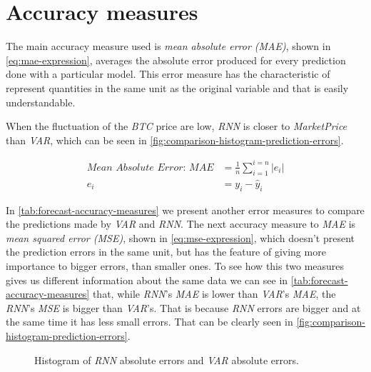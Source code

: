 \section{Accuracy measures}
\label{sec:accuracy-measures}

The main accuracy measure used is \textit{mean absolute error (MAE)},
shown in \autoref{eq:mae-expression}, averages the absolute error
produced for every prediction done with a particular model. This error
measure has the characteristic of represent quantities in the same
unit as the original variable and that is easily understandable.

When the fluctuation of the \textit{BTC} price are low, \textit{RNN}
is closer to \textit{MarketPrice} than \textit{VAR}, which can be seen
in \autoref{fig:comparison-histogram-prediction-errors}.

\begin{equation}
  \begin{aligned}
    \label{eq:mae-expression}
    \textit{Mean Absolute Error: MAE} & =
    \frac{1}{n} \sum_{i=1}^{i=n} |e_i|\\
    e_i & = y_i - \hat{y}_i
  \end{aligned}
\end{equation}

In \autoref{tab:forecast-accuracy-measures} we present another error
measures to compare the predictions made by \textit{VAR} and
\textit{RNN}. The next accuracy measure to \textit{MAE} is
\textit{mean squared error (MSE)}, shown in
\autoref{eq:mse-expression}, which doesn't present the prediction
errors in the same unit, but has the feature of giving more importance
to bigger errors, than smaller ones. To see how this two measures
gives us different information about the same data we can see in
\autoref{tab:forecast-accuracy-measures} that, while \textit{RNN}'s
\textit{MAE} is lower than \textit{VAR}'s \textit{MAE}, the
\textit{RNN}'s \textit{MSE} is bigger than \textit{VAR}'s. That is
because \textit{RNN} errors are bigger and at the same time it has
less small errors. That can be clearly seen in
\autoref{fig:comparison-histogram-prediction-errors}.

\begin{figure}[bth]
  \caption{Histogram of \textit{RNN} absolute errors and \textit{VAR}
    absolute errors.}
  \label{fig:comparison-histogram-prediction-errors}
\end{figure}

